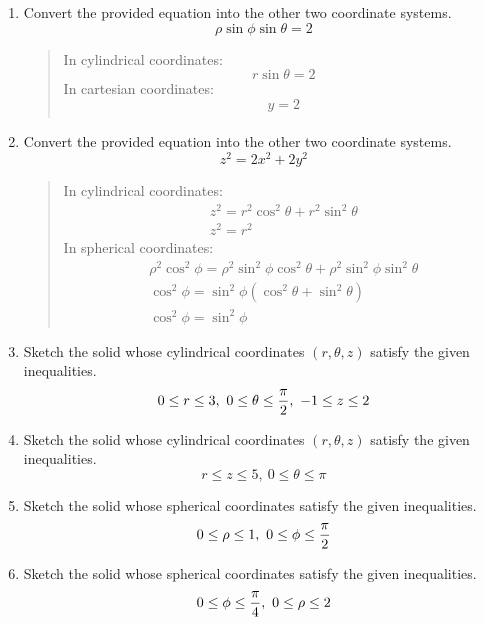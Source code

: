 \documentclass{hw}
\begin{document}
\begin{enumerate}
\item Convert the provided equation into the other two coordinate systems.
\[
\rho\sin{\phi}\sin{\theta} = 2
\]
\begin{quote}
In cylindrical coordinates: \[r\sin{\theta} = 2\]
In cartesian coordinates: \[y=2\]
\begin{gather*}
\end{gather*}
\end{quote}

\item Convert the provided equation into the other two coordinate systems.
\[
z^{2} = 2x^{2} + 2y^{2}
\]
\begin{quote}
In cylindrical coordinates:
\begin{gather*}
z^{2} = r^{2}\cos^{2}{\theta} + r^{2}\sin^{2}{\theta}\\
z^{2} = r^{2}
\end{gather*}
In spherical coordinates:
\begin{gather*}
\rho^{2}\cos^{2}{\phi} = \rho^{2}\sin^{2}{\phi}\cos^{2}{\theta} +
\rho^{2}\sin^{2}{\phi}\sin^{2}{\theta}\\
\cos^{2}{\phi} = \sin^{2}{\phi}(\cos^{2}{\theta} + \sin^{2}{\theta})\\
\cos^{2}{\phi} = \sin^{2}{\phi}
\end{gather*}
\end{quote}

\item Sketch the solid whose cylindrical coordinates $(r,\theta,z)$ satisfy the given
inequalities.
\[
0\leq r\leq3,\ 0\leq\theta\leq{\pi\over2},\ -1\leq z\leq2
\]
\vspace{3cm}

\item Sketch the solid whose cylindrical coordinates $(r,\theta,z)$ satisfy the given
inequalities.
\[
r\leq z\leq 5,\ 0\leq\theta\leq\pi
\]
\vspace{3cm}

\item Sketch the solid whose spherical coordinates satisfy the given inequalities.
\[
0\leq\rho\leq1,\ 0\leq\phi\leq{\pi\over2}
\]
\vspace{3cm}

\item Sketch the solid whose spherical coordinates satisfy the given inequalities.
\[
0\leq\phi\leq{\pi\over4},\ 0\leq\rho\leq2
\]
\vspace{3cm}


\end{enumerate}
\end{document}
